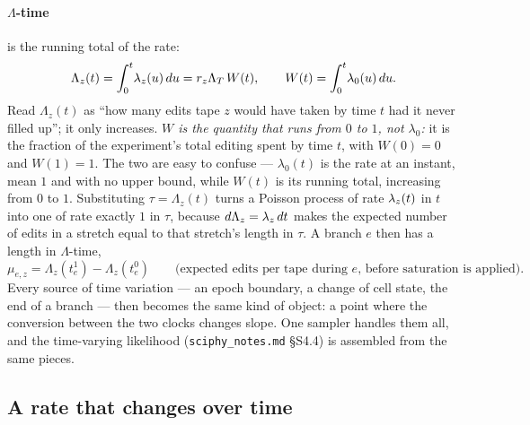 \paragraph{$\Lambda$-time} is the running total of the rate:
\begin{equation}
  \Lambda_z(t)=\int_0^t\!\lambda_z(u)\,du = r_z\Lambda_T\,W(t),
  \qquad W(t)=\int_0^t\!\lambda_0(u)\,du .
  \label{eq:Lambda}
\end{equation}
Read $\Lambda_z(t)$ as ``how many edits tape $z$ would have taken by time $t$ had it never filled
up''; it only increases. \emph{$W$ is the quantity that runs from $0$ to $1$, not $\lambda_0$:} it is
the fraction of the experiment's total editing spent by time $t$, with $W(0)=0$ and $W(1)=1$. The two
are easy to confuse --- $\lambda_0(t)$ is the rate at an instant, mean $1$ and with no upper bound,
while $W(t)$ is its running total, increasing from $0$ to $1$. Substituting $\tau=\Lambda_z(t)$ turns a Poisson process of rate $\lambda_z(t)$
in $t$ into one of rate exactly $1$ in $\tau$, because $d\Lambda_z=\lambda_z\,dt$ makes the expected
number of edits in a stretch equal to that stretch's length in $\tau$. A branch $e$ then has a length
in $\Lambda$-time,
\begin{equation}
  \mu_{e,z}=\Lambda_z(t_e^1)-\Lambda_z(t_e^0)
  \qquad\text{(expected edits per tape during $e$, before saturation is applied).}
  \label{eq:mu}
\end{equation}
Every source of time variation --- an epoch boundary, a change of cell state, the end of a branch ---
then becomes the same kind of object: a point where the conversion between the two clocks changes
slope. One sampler handles them all, and the time-varying likelihood
(\texttt{sciphy\_notes.md} \S S4.4) is assembled from the same pieces.

\subsection{A rate that changes over time}\label{sec:piecewise}


